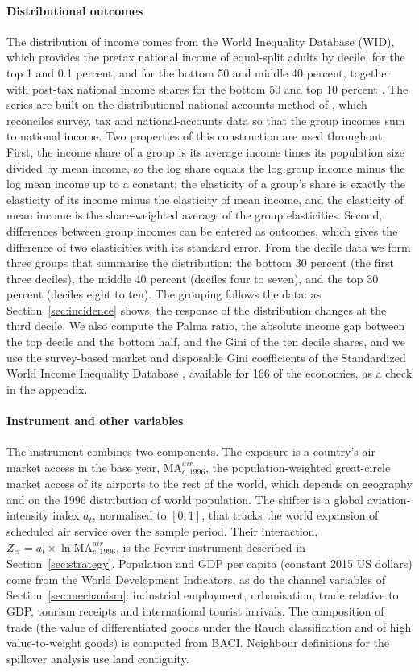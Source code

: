 \paragraph{Distributional outcomes}
The distribution of income comes from the World Inequality Database (WID), which provides the pretax national income of equal-split adults by decile, for the top 1 and 0.1 percent, and for the bottom 50 and middle 40 percent, together with post-tax national income shares for the bottom 50 and top 10 percent \citep{WID_2024}. The series are built on the distributional national accounts method of \citet{Piketty_2017}, which reconciles survey, tax and national-accounts data so that the group incomes sum to national income. Two properties of this construction are used throughout. First, the income share of a group is its average income times its population size divided by mean income, so the log share equals the log group income minus the log mean income up to a constant; the elasticity of a group's share is exactly the elasticity of its income minus the elasticity of mean income, and the elasticity of mean income is the share-weighted average of the group elasticities. Second, differences between group incomes can be entered as outcomes, which gives the difference of two elasticities with its standard error. From the decile data we form three groups that summarise the distribution: the bottom 30 percent (the first three deciles), the middle 40 percent (deciles four to seven), and the top 30 percent (deciles eight to ten). The grouping follows the data: as Section~\ref{sec:incidence} shows, the response of the distribution changes at the third decile. We also compute the Palma ratio, the absolute income gap between the top decile and the bottom half, and the Gini of the ten decile shares, and we use the survey-based market and disposable Gini coefficients of the Standardized World Income Inequality Database \citep{Solt_2020}, available for 166 of the economies, as a check in the appendix.

\paragraph{Instrument and other variables}
The instrument combines two components. The exposure is a country's air market access in the base year, $\mathrm{MA}^{air}_{c,1996}$, the population-weighted great-circle market access of its airports to the rest of the world, which depends on geography and on the 1996 distribution of world population. The shifter is a global aviation-intensity index $a_t$, normalised to $[0,1]$, that tracks the world expansion of scheduled air service over the sample period. Their interaction, $Z_{ct}=a_t\times\ln\mathrm{MA}^{air}_{c,1996}$, is the Feyrer instrument described in Section~\ref{sec:strategy}. Population and GDP per capita (constant 2015 US dollars) come from the World Development Indicators, as do the channel variables of Section~\ref{sec:mechanism}: industrial employment, urbanisation, trade relative to GDP, tourism receipts and international tourist arrivals. The composition of trade (the value of differentiated goods under the Rauch classification and of high value-to-weight goods) is computed from BACI. Neighbour definitions for the spillover analysis use land contiguity.

